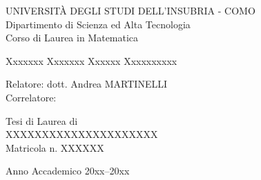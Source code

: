\documentclass[12pt,oneside]{amsbook}%
\theoremstyle{plain}
\theoremstyle{definition}
\theoremstyle{definition}
\begin{document}
\frontmatter
\begin {titlepage}
\begin{center}
UNIVERSIT\`A DEGLI STUDI DELL'INSUBRIA - COMO\\
Dipartimento di Scienza ed Alta Tecnologia\\
Corso di Laurea in Matematica
\end{center}
\vfill
\begin{figure}[h]
	\begin{center} 
	\end{center} 
\end{figure}
\vfill
\begin{center}
\LARGE{Xxxxxxx Xxxxxxx Xxxxxx Xxxxxxxxxx}
\end{center}
\vfill
\vfill
\vfill
\begin{flushleft}
Relatore: dott. Andrea MARTINELLI\\
Correlatore: 
\end{flushleft}
\vfill
\begin{flushright}
Tesi di Laurea di\\
XXXXXXXXXXXXXXXXXXXXX\\
Matricola n. XXXXXX
\end{flushright}
\vfill
\begin{center}
Anno Accademico 20xx--20xx
\end{center}
\end{titlepage}

\tableofcontents





\mainmatter






\end{document}
